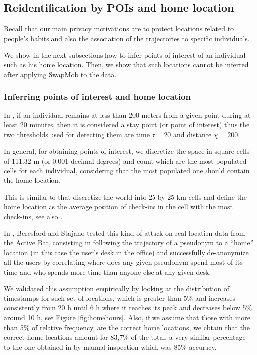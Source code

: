 \documentclass[]{llncs}
\begin{document}
\subsection{Reidentification by POIs and home location}
Recall that our main privacy motivations are to protect locations related to people's habits and also the association of the trajectories to specific individuals.

We show in the next subsections how to infer points of interest of an individual such as his home location. Then, we show that such locations cannot be inferred after applying SwapMob to the data. 



\subsubsection{Inferring points of interest and home location}
In \cite{Zheng2009}, if an individual remains at less than 200 meters from a given point during at least 20 minutes, then it is considered a stay point (or point of interest) thus the two thresholds used for detecting them are time $\tau = 20$ and distance $\chi = 200$. 

In general, for obtaining points of interest, we discretize the space in square cells of 111.32 m (or 0.001 decimal degrees) and count which are the most populated cells for each individual, considering that the most populated one should contain the home location. 

This is similar to \cite{Cho2011} that discretize the world into 25 by 25 km cells and define the home location as the average position of check-ins in the cell with the most check-ins, see also \cite{scellato2011sociospatial}.

In \cite{Beresford2003}, Beresford and Stajano tested this kind of attack on real location data from the Active Bat, consisting in following the trajectory of a pseudonym to a ``home'' location (in this case the user's desk in the office) and successfully de-anonymize all the users by correlating  where does any given pseudonym spend most of its time and who spends more time than anyone else at any given desk.


We validated this assumption empirically by looking at the distribution of timestamps for such set of locations, which is greater than 5\% and increases consistently from 20 h until 6 h where it reaches its peak and decreases below 5\% around 10 h, see Figure \ref{fig:homehours}.
Also, if we assume that those with more than 5\% of relative frequency, are the correct home locations, we obtain that the correct home locations amount for 83,7\% of the total, a very similar percentage to the one obtained in \cite{Cho2011} 
by manual inspection which was 85\% accuracy.
\end{document}
